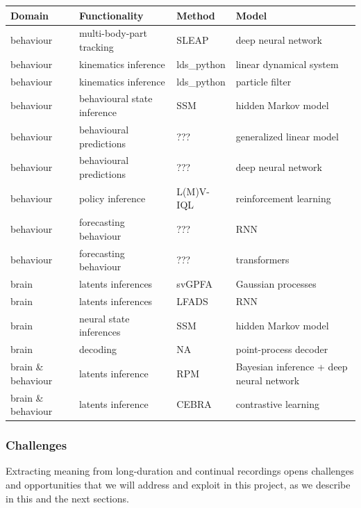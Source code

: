 \documentclass[12pt]{article}
\begin{document}
\begin{longtable}{|p{1.9cm}|p{3cm}|p{2.5cm}|p{4.5cm}|}
    \hline
    \textbf{Domain} & \textbf{Functionality} & \textbf{Method} & \textbf{Model} \\
    \hline
    behaviour & multi-body-part tracking & SLEAP & deep neural network \\
    \hline
    behaviour & kinematics inference & lds\_python & linear dynamical system \\
    \hline
    behaviour & kinematics inference & lds\_python & particle filter \\
    \hline
    behaviour & behavioural state inference & SSM & hidden Markov model \\
    \hline
    behaviour & behavioural predictions & ??? & generalized linear model \\
    \hline
    behaviour & behavioural predictions & ??? & deep neural network \\
    \hline
    behaviour & policy inference & L(M)V-IQL & reinforcement learning \\
    \hline
    behaviour & forecasting behaviour & ??? & RNN \\
    \hline
    behaviour & forecasting behaviour & ??? & transformers \\
    \hline
    brain & latents inferences & svGPFA & Gaussian processes \\
    \hline
    brain & latents inferences & LFADS & RNN \\
    \hline
    brain & neural state inferences & SSM & hidden Markov model \\
    \hline
    brain & decoding & NA & point-process decoder \\
    \hline
    brain \& behaviour & latents inference & RPM & Bayesian inference + deep neural network \\
    \hline
    brain \& behaviour & latents inference & CEBRA & contrastive learning \\
    \hline
\end{longtable}

\subsubsection{Challenges}

Extracting meaning from long-duration and continual recordings opens
challenges and opportunities that we will address and exploit in this project,
as we describe in this and the next sections.
\end{document}
